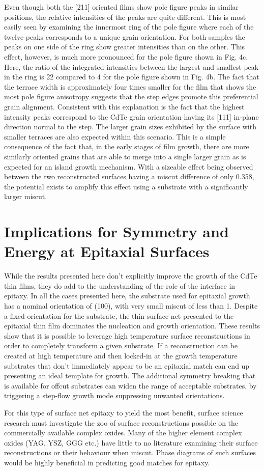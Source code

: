 Even though both the [211] oriented films show pole figure
peaks in similar positions, the relative intensities of the peaks are
quite different. This is most easily seen by examining the
innermost ring of the pole figure where each of the twelve peaks
corresponds to a unique grain orientation. For both samples the
peaks on one side of the ring show greater intensities than on the
other. This effect, however, is much more pronounced for the pole
figure shown in Fig. 4c. Here, the ratio of the integrated intensities
between the largest and smallest peak in the ring is 22 compared to
4 for the pole figure shown in Fig. 4b. The fact that the terrace
width is approximately four times smaller for the film that shows
the most pole figure anisotropy suggests that the step edges
promote this preferential grain alignment. Consistent with this
explanation is the fact that the highest intensity peaks correspond
to the CdTe grain orientation having its [111] in-plane direction
normal to the step. The larger grain sizes exhibited by the surface
with smaller terraces are also expected within this scenario. This is
a simple consequence of the fact that, in the early stages of film
growth, there are more similarly oriented grains that are able to
merge into a single larger grain as is expected for an island growth
mechanism. With a sizeable effect being observed between the two
reconstructed surfaces having a miscut difference of only 0.358, the
potential exists to amplify this effect using a substrate with a
significantly larger miscut.
\section{Implications for Symmetry and Energy at Epitaxial Surfaces}
While the results presented here don't explicitly improve the growth of the CdTe thin films, they do add to the understanding of the role of the interface in epitaxy. In all the cases presented here, the substrate used for epitaxial growth has a nominal orientation of (100), with very small miscut of less than 1\degree. Despite a fixed orientation for the substrate, the thin surface net presented to the epitaxial thin film dominates the nucleation and growth orientation. These results show that it is possible to leverage high temperature surface reconstructions in order to completely transform a given substrate. If a reconstruction can be created at high temperature and then locked-in at the growth temperature substrates that don't immediately appear to be an epitaxial match can end up presenting an ideal template for growth. The additional symmetry breaking that is available for offcut substrates can widen the range of acceptable substrates, by triggering a step-flow growth mode suppressing unwanted orientations.

For this type of surface net epitaxy to yield the most benefit, surface science research must investigate the zoo of surface reconstructions possible on the commercially available complex oxides. Many of the higher element complex oxides (YAG, YSZ, GGG etc.) have little to no literature examining their surface reconstructions or their behaviour when miscut. Phase diagrams of such surfaces would be highly beneficial in predicting good matches for epitaxy.